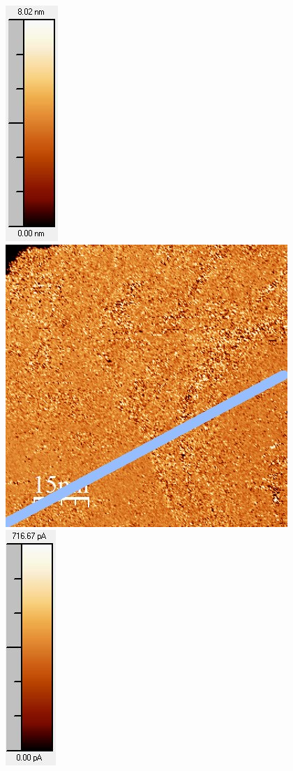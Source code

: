 \documentclass[12pt,a4paper]{article}
\begin{document}
\begin{figure}[H]
\includegraphics[scale=0.6]{Bilder/Anhang/Zeit/2_Zeit_nach_Skala.jpg}
\includegraphics[scale=0.6]{Bilder/Anhang/Zeit/Strom/2_Zeit_vor_Strom.jpg}
\includegraphics[scale=0.6]{Bilder/Anhang/Zeit/Strom/2_Zeit_vor_Strom_Skala.jpg}

\end{figure}
\end{document}
